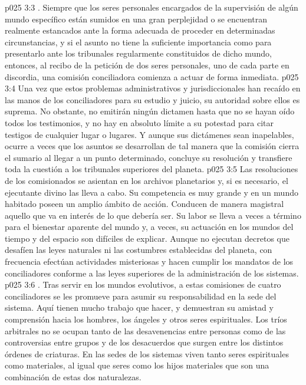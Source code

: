 \vs p025 3:3 . Siempre que los seres personales encargados de la supervisión de algún mundo específico están sumidos en una gran perplejidad o se encuentran realmente estancados ante la forma adecuada de proceder en determinadas circunstancias, y si el asunto no tiene la suficiente importancia como para presentarlo ante los tribunales regularmente constituidos de dicho mundo, entonces, al recibo de la petición de dos seres personales, uno de cada parte en discordia, una comisión conciliadora comienza a actuar de forma inmediata.
\vs p025 3:4 Una vez que estos problemas administrativos y jurisdiccionales han recaído en las manos de los conciliadores para su estudio y juicio, su autoridad sobre ellos es suprema. No obstante, no emitirán ningún dictamen hasta que no se hayan oído todos los testimonios, y no hay en absoluto límite a su potestad para citar testigos de cualquier lugar o lugares. Y aunque sus dictámenes sean inapelables, ocurre a veces que los asuntos se desarrollan de tal manera que la comisión cierra el sumario al llegar a un punto determinado, concluye su resolución y transfiere toda la cuestión a los tribunales superiores del planeta.
\vs p025 3:5 Las resoluciones de los comisionados se asientan en los archivos planetarios y, si es necesario, el ejecutante divino las lleva a cabo. Su competencia es muy grande y en un mundo habitado poseen un amplio ámbito de acción. Conducen de manera magistral aquello que va en interés de lo que debería ser. Su labor se lleva a veces a término para el bienestar aparente del mundo y, a veces, su actuación en los mundos del tiempo y del espacio son difíciles de explicar. Aunque no ejecutan decretos que desafíen las leyes naturales ni las costumbres establecidas del planeta, con frecuencia efectúan actividades misteriosas y hacen cumplir los mandatos de los conciliadores conforme a las leyes superiores de la administración de los sistemas.
\vs p025 3:6 . Tras servir en los mundos evolutivos, a estas comisiones de cuatro conciliadores se les promueve para asumir su responsabilidad en la sede del sistema. Aquí tienen mucho trabajo que hacer, y demuestran su amistad y comprensión hacia los hombres, los ángeles y otros seres espirituales. Los tríos arbitrales no se ocupan tanto de las desavenencias entre personas como de las controversias entre grupos y de los desacuerdos que surgen entre los distintos órdenes de criaturas. En las sedes de los sistemas viven tanto seres espirituales como materiales, al igual que seres como los hijos materiales que son una combinación de estas dos naturalezas.
